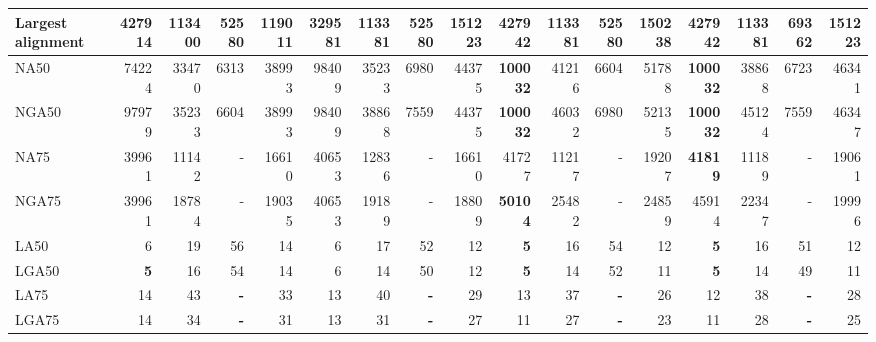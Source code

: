 \documentclass[12pt,a4paper]{article}
\begin{document}
\begin{table}[ht]
\begin{center}
\begin{tabular}{|l*{16}{|r}|}
Largest alignment & 427914 & 113400 & 52580 & 119011 & 329581 & 113381 & 52580 & 151223 & {\bf 427942} & 113381 & 52580 & 150238 & {\bf 427942} & 113381 & 69362 & 151223 \\ \hline
NA50 & 74224 & 33470 & 6313 & 38993 & 98409 & 35233 & 6980 & 44375 & {\bf 100032} & 41216 & 6604 & 51788 & {\bf 100032} & 38868 & 6723 & 46341 \\ \hline
NGA50 & 97979 & 35233 & 6604 & 38993 & 98409 & 38868 & 7559 & 44375 & {\bf 100032} & 46032 & 6980 & 52135 & {\bf 100032} & 45124 & 7559 & 46347 \\ \hline
NA75 & 39961 & 11142 & - & 16610 & 40653 & 12836 & - & 16610 & 41727 & 11217 & - & 19207 & {\bf 41819} & 11189 & - & 19061 \\ \hline
NGA75 & 39961 & 18784 & - & 19035 & 40653 & 19189 & - & 18809 & {\bf 50104} & 25482 & - & 24859 & 45914 & 22347 & - & 19996 \\ \hline
LA50 & 6 & 19 & 56 & 14 & 6 & 17 & 52 & 12 & {\bf 5} & 16 & 54 & 12 & {\bf 5} & 16 & 51 & 12 \\ \hline
LGA50 & {\bf 5} & 16 & 54 & 14 & 6 & 14 & 50 & 12 & {\bf 5} & 14 & 52 & 11 & {\bf 5} & 14 & 49 & 11 \\ \hline
LA75 & 14 & 43 & {\bf -} & 33 & 13 & 40 & {\bf -} & 29 & 13 & 37 & {\bf -} & 26 & 12 & 38 & {\bf -} & 28 \\ \hline
LGA75 & 14 & 34 & {\bf -} & 31 & 13 & 31 & {\bf -} & 27 & 11 & 27 & {\bf -} & 23 & 11 & 28 & {\bf -} & 25 \\ \hline
\end{tabular}
\end{center}
\end{table}
\end{document}
